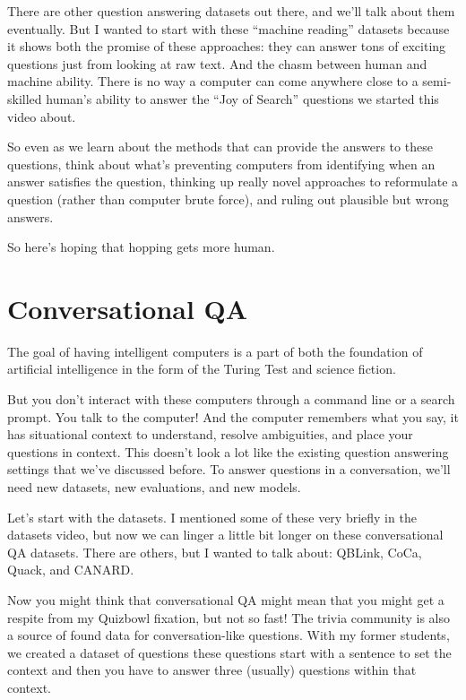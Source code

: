 There are other question answering datasets out there, and we’ll talk about them eventually.  But I wanted to start with these “machine reading” datasets because it shows both the promise of these approaches: they can answer tons of exciting questions just from looking at raw text.  And the chasm between human and machine ability.  There is no way a computer can come anywhere close to a semi-skilled human’s ability to answer the “Joy of Search” questions we started this video about.  

So even as we learn about the methods that can provide the answers to these questions, think about what’s preventing computers from identifying when an answer satisfies the question, thinking up really novel approaches to reformulate a question (rather than computer brute force), and ruling out plausible but wrong answers.

So here’s hoping that hopping gets more human.


\section{Conversational QA}

The goal of having intelligent computers is a part of both the foundation of artificial intelligence in the form of the Turing Test and science fiction.

But you don’t interact with these computers through a command line or a search prompt.  You talk to the computer!  And the computer remembers what you say, it has situational context to understand, resolve ambiguities, and place your questions in context.  
This doesn’t look a lot like the existing question answering settings that we’ve discussed before.  To answer questions in a conversation, we’ll need new datasets, new evaluations, and new models.

Let’s start with the datasets.  I mentioned some of these very briefly in the datasets video, but now we can linger a little bit longer on these conversational QA datasets.  There are others, but I wanted to talk about: QBLink, CoCa, Quack, and CANARD.  

Now you might think that conversational QA might mean that you might get a respite from my Quizbowl fixation, but not so fast!  The trivia community is also a source of found data for conversation-like questions.  With my former students, we created a dataset of questions these questions start with a sentence to set the context and then you have to answer three (usually) questions within that context.  


